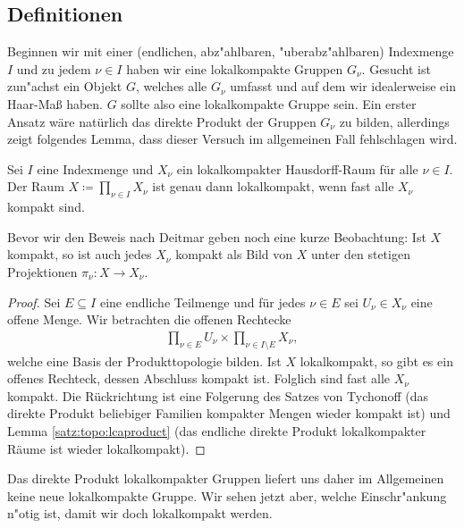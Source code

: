 \subsection{Definitionen}\label{kapitel:RDP}
		Beginnen wir mit einer (endlichen, abz"ahlbaren, "uberabz"ahlbaren) Indexmenge $I$ und zu jedem $\nu\in I$ haben wir eine lokalkompakte Gruppen $G_\nu$.
		Gesucht ist zun"achst ein Objekt $G$, welches alle $G_\nu$ umfasst und auf dem wir idealerweise ein Haar-Maß haben.
		$G$ sollte also eine lokalkompakte Gruppe sein.
		Ein erster Ansatz wäre natürlich das direkte Produkt der Gruppen $G_\nu$ zu bilden, allerdings zeigt folgendes Lemma, dass dieser Versuch im allgemeinen Fall fehlschlagen wird.
		\begin{lemma}\label{Lemma:lokalkompaktProd}
			Sei $I$ eine Indexmenge und $X_\nu$ ein lokalkompakter Hausdorff-Raum für alle $\nu \in I$. Der Raum $X\coloneqq \prod_{\nu \in I} X_\nu$ ist genau dann lokalkompakt, wenn fast alle $X_\nu$ kompakt sind.
		\end{lemma}
		Bevor wir den Beweis nach Deitmar geben noch eine kurze Beobachtung: 
		Ist $X$ kompakt, so ist auch jedes $X_\nu$ kompakt als Bild von $X$ unter den stetigen Projektionen $\pi_\nu:X \to X_\nu$.
		\begin{proof}
			Sei $E \subseteq I$ eine endliche Teilmenge und für jedes $\nu\in E$ sei $U_\nu \in X_\nu$ eine offene Menge. 
			Wir betrachten die offenen Rechtecke
			\begin{align*}
				\prod_{\nu\in E} U_\nu \times \prod_{\nu\in I\setminus E} X_\nu,
			\end{align*}
			welche eine Basis der Produkttopologie bilden. 
			Ist $X$ lokalkompakt, so gibt es ein offenes Rechteck, dessen Abschluss kompakt ist. 
			Folglich sind fast alle $X_\nu$ kompakt. 
			Die Rückrichtung ist eine Folgerung des Satzes von Tychonoff (das direkte Produkt beliebiger Familien kompakter Mengen wieder kompakt ist) und Lemma \ref{satz:topo:lcaproduct} (das endliche direkte Produkt lokalkompakter Räume ist wieder lokalkompakt).
		\end{proof}
		Das direkte Produkt lokalkompakter Gruppen liefert uns daher im Allgemeinen keine neue lokalkompakte Gruppe. 
		Wir sehen jetzt aber, welche Einschr"ankung n"otig ist, damit wir doch lokalkompakt werden.
